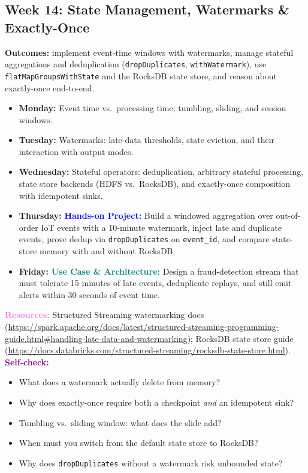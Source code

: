 \documentclass[11pt, a4paper]{article}
\newcommand{\project}[1]{\vspace{1mm}\noindent\textbf{\textcolor{blue}{Hands-on Project:}} #1}
\newcommand{\usecase}[1]{\vspace{1mm}\noindent\textbf{\textcolor{teal}{Use Case \& Architecture:}} #1}
\newcommand{\dayitem}[2]{\item \textbf{#1:} #2}
\newcommand{\resources}[1]{\vspace{1mm}\noindent\textbf{\textcolor{violet}{Resources:}} #1}
\newcommand{\selfcheck}[1]{\vspace{1mm}\noindent\textbf{\textcolor{purple}{Self-check:}} #1}
\begin{document}
\subsection*{Week 14: State Management, Watermarks \& Exactly-Once}
\par\noindent\textbf{Outcomes:} implement event-time windows with watermarks, manage stateful aggregations and deduplication (\texttt{dropDuplicates}, \texttt{withWatermark}), use \texttt{flatMapGroupsWithState} and the RocksDB state store, and reason about exactly-once end-to-end.
\begin{itemize}[label=-]
    \dayitem{Monday}{Event time vs.\ processing time; tumbling, sliding, and session windows.}
    \dayitem{Tuesday}{Watermarks: late-data thresholds, state eviction, and their interaction with output modes.}
    \dayitem{Wednesday}{Stateful operators: deduplication, arbitrary stateful processing, state store backends (HDFS vs.\ RocksDB), and exactly-once composition with idempotent sinks.}
    \dayitem{Thursday}{\project{Build a windowed aggregation over out-of-order IoT events with a 10-minute watermark, inject late and duplicate events, prove dedup via \texttt{dropDuplicates} on \texttt{event\_id}, and compare state-store memory with and without RocksDB.}}
    \dayitem{Friday}{\usecase{Design a fraud-detection stream that must tolerate 15 minutes of late events, deduplicate replays, and still emit alerts within 30 seconds of event time.}}
\end{itemize}
\resources{Structured Streaming watermarking docs (\url{https://spark.apache.org/docs/latest/structured-streaming-programming-guide.html\#handling-late-data-and-watermarking}); RocksDB state store guide (\url{https://docs.databricks.com/structured-streaming/rocksdb-state-store.html}).}
\selfcheck{\begin{itemize}[label=-, leftmargin=1.5em, itemsep=0pt]
    \item What does a watermark actually delete from memory?
    \item Why does exactly-once require both a checkpoint \emph{and} an idempotent sink?
    \item Tumbling vs.\ sliding window: what does the slide add?
    \item When must you switch from the default state store to RocksDB?
    \item Why does \texttt{dropDuplicates} without a watermark risk unbounded state?
\end{itemize}}
\end{document}
